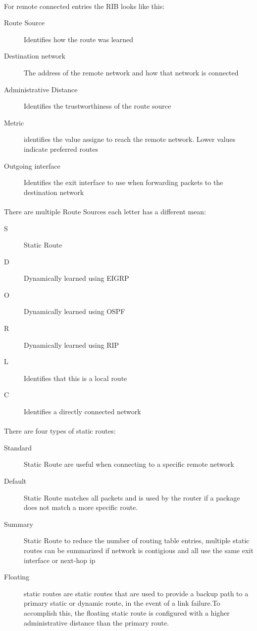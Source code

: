\documentclass[10pt,landscape]{article}
\begin{document}
\begin{multicols}{3}
\paragraph{}For remote connected entries the RIB looks like this:
 \begin{description}
	\item[Route Source] Identifies how the route was learned
	\item[Destination network]The address of the remote network and how that network is connected
	\item[Administrative Distance] Identifies the trustworthiness of the route source
	\item[Metric] identifies the value assigne to reach the remote network. Lower values indicate preferred routes
	\item[Outgoing interface]  Identifies the exit interface to use when forwarding packets to the destination network
\end{description}
\paragraph{}
There are multiple Route Sources each letter has a different mean:
\begin{description}
	\item[S] Static Route
	\item[D] Dynamically learned using EIGRP
	\item[O] Dynamically learned using OSPF
	\item[R] Dynamically learned using RIP
	\item[L] Identifies that this is a local route
	\item[C] Identifies a directly connected network
\end{description}
\paragraph{}
There are four types of static routes:
\begin{description}
	\item[Standard] Static Route are useful when connecting to a specific remote network
	\item[Default]  Static Route matches all packets and is used by the router if a package does not match a more specific route.
	\item[Summary] Static Route to reduce the number of routing table entries, multiple static routes can be summarized if network is contigious and all use the same exit interface or next-hop ip
	\item[Floating] static routes are static routes that are used to provide a backup path to a primary static or dynamic route, in the event of a link failure.To accomplish this, the floating static route is configured with a higher administrative distance than the primary route.
\end{description}

\end{multicols}
\end{document}
